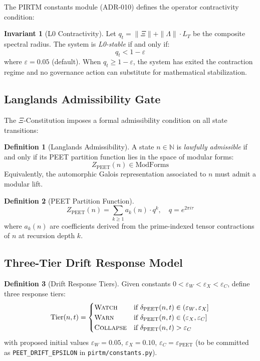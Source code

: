 \documentclass[11pt,letterpaper]{article}
\theoremstyle{definition}
\newtheorem{definition}{Definition}[section]
\newtheorem{invariant}{Invariant}[section]
\theoremstyle{remark}
\newcommand{\peet}{\mathrm{PEET}}
\newcommand{\pirtm}{\textsc{PIRTM}}
\newcommand{\xicons}{\(\Xi\)-Constitution}
\newcommand{\modforms}{\mathrm{ModForms}}
\begin{document}
The \pirtm{} constants module (ADR-010) defines the operator
contractivity condition:

\begin{invariant}[L0 Contractivity]
\label{inv:contractivity}
Let \(q_t = \|\Xi\| + \|\Lambda\| \cdot L_T\) be the composite
spectral radius. The system is \emph{L0-stable} if and only if:
\[
  q_t < 1 - \varepsilon
\]
where \(\varepsilon = 0.05\) (default). When \(q_t \geq 1 - \varepsilon\),
the system has exited the contraction regime and no governance
action can substitute for mathematical stabilization.
\end{invariant}

\subsection{Langlands Admissibility Gate}

The \xicons{} imposes a formal admissibility condition on all
state transitions:

\begin{definition}[Langlands Admissibility]
A state \(n \in \mathbb{N}\) is \emph{lawfully admissible} if and
only if its PEET partition function lies in the space of modular forms:
\[
  Z_{\peet}(n) \in \modforms
\]
Equivalently, the automorphic Galois representation associated to
\(n\) must admit a modular lift.
\end{definition}

\begin{definition}[PEET Partition Function]
\[
  Z_{\peet}(n) = \sum_{k \geq 1} a_k(n) \cdot q^k, \quad q = e^{2\pi i \tau}
\]
where \(a_k(n)\) are coefficients derived from the prime-indexed
tensor contractions of \(n\) at recursion depth \(k\).
\end{definition}

\subsection{Three-Tier Drift Response Model}

\begin{definition}[Drift Response Tiers]
Given constants \(0 < \varepsilon_W < \varepsilon_X < \varepsilon_C\),
define three response tiers:
\[
  \text{Tier}(n,t) = \begin{cases}
    \textsc{Watch}    & \text{if } \delta_{\peet}(n,t) \in (\varepsilon_W, \varepsilon_X] \\
    \textsc{Warn}     & \text{if } \delta_{\peet}(n,t) \in (\varepsilon_X, \varepsilon_C] \\
    \textsc{Collapse} & \text{if } \delta_{\peet}(n,t) > \varepsilon_C
  \end{cases}
\]
with proposed initial values \(\varepsilon_W = 0.05\),
\(\varepsilon_X = 0.10\), \(\varepsilon_C = \varepsilon_{\peet}\)
(to be committed as \texttt{PEET\_DRIFT\_EPSILON} in
\texttt{pirtm/constants.py}).
\end{definition}
\end{document}
